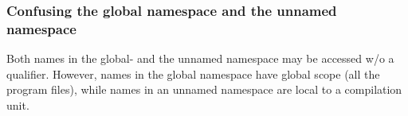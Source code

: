 \subsubsection*{Confusing the global namespace and the unnamed namespace}
Both names in the global- and the unnamed namespace may be accessed w/o a qualifier.
However, names in the global namespace have global scope (all the program files), while names
in an unnamed namespace are local to a compilation unit.























































